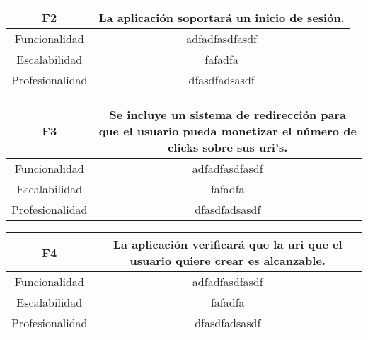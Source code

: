 \documentclass{article}
\begin{document}
\begin{table}[hbtp]
    \footnotesize
    \centering
    \settowidth{}
    \setlength\extrarowheight{5pt}
    \begin{tabulary}{\textwidth}{ C C }
        \textbf{F2} & La aplicación soportará un inicio de sesión.
        \\
    \hline
    
    Funcionalidad & adfadfasdfasdf\\
        
    Escalabilidad & fafadfa \\

    Profesionalidad & dfasdfadsasdf \\

    \end{tabulary}
\end{table}

\begin{table}[hbtp]
    \footnotesize
    \centering
    \settowidth{}
    \setlength\extrarowheight{5pt}
    \begin{tabulary}{\textwidth}{ C C }
        \textbf{F3} & Se incluye un sistema de redirección para que el usuario pueda monetizar el número de clicks sobre sus uri's.
        \\
    \hline
    
    Funcionalidad & adfadfasdfasdf\\
        
    Escalabilidad & fafadfa \\

    Profesionalidad & dfasdfadsasdf \\

    \end{tabulary}
\end{table}

\begin{table}[hbtp]
    \footnotesize
    \centering
    \settowidth{}
    \setlength\extrarowheight{5pt}
    \begin{tabulary}{\textwidth}{ C C }
        \textbf{F4} & La aplicación verificará que la uri que el usuario quiere crear es alcanzable. 
        \\
    \hline
    
    Funcionalidad & adfadfasdfasdf\\
        
    Escalabilidad & fafadfa \\

    Profesionalidad & dfasdfadsasdf \\

    \end{tabulary}
    
\end{table}
 
\end{document}
